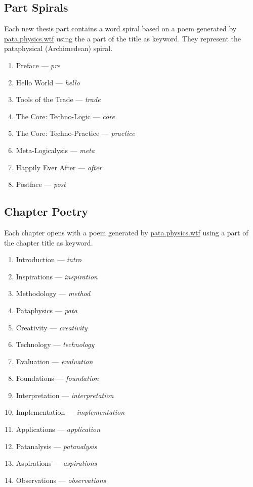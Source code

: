 \subsection*{Part Spirals}

Each new thesis part contains a word spiral based on a poem generated by \url{pata.physics.wtf} using the a part of the title as keyword. They represent the pataphysical (Archimedean) spiral.

\begin{enumerate}
  \item Preface --- \textit{pre}
  \item Hello World --- \textit{hello}
  \item Tools of the Trade --- \textit{trade}
  \item The Core: Techno-Logic --- \textit{core}
  \item The Core: Techno-Practice --- \textit{practice}
  \item Meta-Logicalysis --- \textit{meta}
  \item Happily Ever After --- \textit{after}
  \item Postface --- \textit{post}
\end{enumerate}


\subsection*{Chapter Poetry}

Each chapter opens with a poem generated by \url{pata.physics.wtf} using a part of the chapter title as keyword.

\begin{enumerate}
  \item Introduction --- \textit{intro}
  \item Inspirations --- \textit{inspiration}
  \item Methodology --- \textit{method}
  \item Pataphysics --- \textit{pata}
  \item Creativity --- \textit{creativity}
  \item Technology --- \textit{technology}
  \item Evaluation --- \textit{evaluation}
  \item Foundations --- \textit{foundation}
  \item Interpretation --- \textit{interpretation}
  \item Implementation --- \textit{implementation}
  \item Applications --- \textit{application}
  \item Patanalysis --- \textit{patanalysis}
  \item Aspirations --- \textit{aspirations}
  \item Observations --- \textit{observations}
\end{enumerate}

